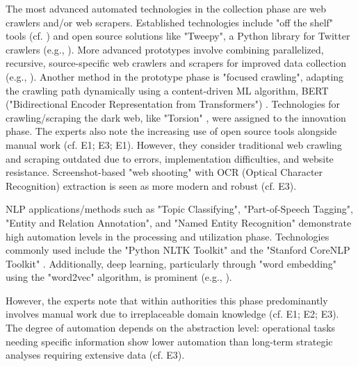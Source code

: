 \documentclass[10pt]{article}
\begin{document}
The most advanced automated technologies in the collection phase are web crawlers and/or web scrapers.
Established technologies include "off the shelf" tools (cf. \cite{Middleton.2020}) and open source
solutions like "Tweepy", a Python library for Twitter crawlers (e.g., \cite{Adewopo.2020}).
More advanced prototypes involve combining parallelized, recursive, source-specific web crawlers and scrapers for improved
data collection (e.g., \cite{Jenkins.2021}). Another method in the prototype phase is
"focused crawling", adapting the crawling path dynamically using a content-driven ML algorithm, BERT ("Bidirectional Encoder Representation from Transformers")
\cite{Kuehn.2023}. Technologies for crawling/scraping the dark web, like "Torsion" \cite{Sonawane.2022},
were assigned to the innovation phase. The experts also note the increasing use of open source tools alongside manual work
(cf. E1; E3; E1). However, they consider traditional web crawling and scraping
outdated due to errors, implementation difficulties, and website resistance. Screenshot-based "web shooting" with
OCR (Optical Character Recognition) extraction is seen as more modern and robust (cf. E3).

NLP applications/methods such as "Topic Classifying", "Part-of-Speech Tagging", "Entity and Relation Annotation", and "Named Entity Recognition"
demonstrate high automation levels in the processing and utilization phase. Technologies commonly used include
the "Python NLTK Toolkit" \cite{Hubbard.2022} and the "Stanford CoreNLP Toolkit" \cite{Middleton.2020}.
Additionally, deep learning, particularly through "word embedding" using the "word2vec" algorithm, is prominent
(e.g., \cite{Bai.2020}).


However, the experts note that within authorities this phase predominantly involves manual work due to irreplaceable domain knowledge
(cf. E1; E2; E3). The degree of automation depends on the abstraction level:
operational tasks needing specific information show lower automation than long-term strategic analyses requiring
extensive data (cf. E3).
\end{document}
